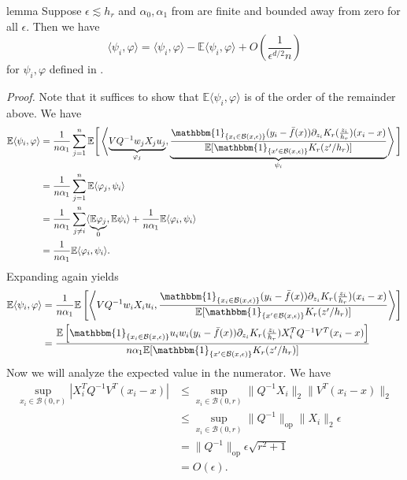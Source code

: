 \documentclass[11pt]{article}
\begin{document}
\begin{restatable}{lemma}{} \label{lemma: inner prod decomp}
    Suppose $\epsilon \lesssim h_r$ and $\alpha_0, \alpha_1$ from  are finite and bounded away from zero for all $\epsilon$. Then we have 
    \[\langle\psi_i, \varphi\rangle = \langle\psi_i, \varphi\rangle -\mathbb{E}\langle\psi_i, \varphi\rangle + O\left(\frac{1}{\epsilon^{d/2}n}\right)\]
    for $\psi_i, \varphi$ defined in . 
\end{restatable}
\noindent \textit{Proof.} Note that it suffices to show that $\mathbb{E}\langle \psi_i, \varphi\rangle$ is of the order of the remainder above. We have
\begin{align}
     \mathbb{E}\langle \psi_i, \varphi\rangle&= \frac{1}{n\alpha_1}\sum_{j = 1}^n\mathbb{E}\Bigg[\left\langle\underbrace{VQ^{-1}w_jX_ju_j}_{\varphi_j},\underbrace{\frac{\mathbbm{1}_{\{x_i \in \mathcal{B}(x, \epsilon)\}}(y_i - \bar{f}(x))\partial_{z_i}K_r(\frac{z_i}{h_r})(x_i - x)}{\mathbb{E}[\mathbbm{1}_{\{x' \in \mathcal{B}(x, \epsilon)\}}K_r(z'/h_r)]}}_{\psi_i}\right\rangle\Bigg] \\
     &= \frac{1}{n\alpha_1}\sum_{j = 1}^n\mathbb{E}\langle\varphi_j, \psi_i\rangle \\
     &= \frac{1}{n\alpha_1}\sum_{j \neq i}^n\langle\underbrace{\mathbb{E}\varphi_j}_0, \mathbb{E}\psi_i\rangle + \frac{1}{n\alpha_1}\mathbb{E}\langle\varphi_i, \psi_i\rangle \\
     &= \frac{1}{n\alpha_1}\mathbb{E}\langle\varphi_i, \psi_i\rangle.
\end{align}
Expanding again yields
\begin{align}
    \mathbb{E}\langle \psi_i, \varphi\rangle &= \frac{1}{n\alpha_1}\mathbb{E}\left[\left\langle VQ^{-1}w_iX_iu_i, \frac{\mathbbm{1}_{\{x_i \in \mathcal{B}(x, \epsilon)\}}(y_i - \bar{f}(x))\partial_{z_i}K_r(\frac{z_i}{h_r})(x_i - x)}{\mathbb{E}[\mathbbm{1}_{\{x' \in \mathcal{B}(x, \epsilon)\}}K_r(z'/h_r)]}\right\rangle\right] \\
    &= \frac{\mathbb{E}\left[ \mathbbm{1}_{\{x_i \in \mathcal{B}(x, \epsilon)\}}u_iw_i(y_i - \bar{f}(x))\partial_{z_i}K_r(\frac{z_i}{h_r})X_i^TQ^{-1}V^T(x_i - x)\right]}{n\alpha_1\mathbb{E}[\mathbbm{1}_{\{x' \in \mathcal{B}(x, \epsilon)\}}K_r(z'/h_r)]}
\end{align}
Now we will analyze the expected value in the numerator. We have
\begin{align}
    \sup_{x_i \in \mathcal{B}(0, r)}|X_i^TQ^{-1}V^T(x_i - x)| &\leq \sup_{x_i \in \mathcal{B}(0, r)}\|Q^{-1}X_i\|_2 \|V^T(x_i - x)\|_2 \\
    &\leq \sup_{x_i \in \mathcal{B}(0, r)}\|Q^{-1}\|_{\text{op}}\|X_i\|_2\epsilon \\
    &= \|Q^{-1}\|_{\text{op}}\epsilon\sqrt{r^2 + 1} \\
    &= O(\epsilon).
\end{align}
\end{document}
